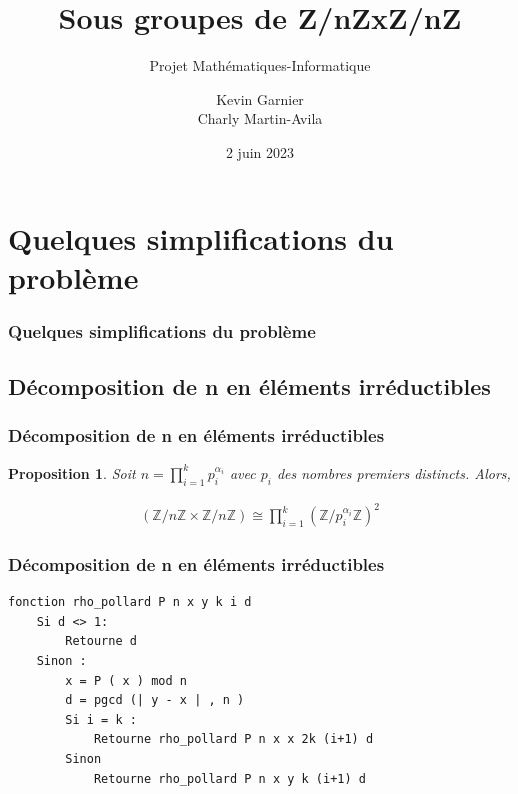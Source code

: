 \documentclass{beamer}
\title{
    Sous groupes de Z/nZxZ/nZ
}
\subtitle{Projet Mathématiques-Informatique}
\institute[U. Paris Cité]{Université Paris Cité}
\author[Kevin G., Charly M.A.]{
    Kevin Garnier \\    Charly Martin-Avila
}
\date{2 juin 2023}
\newtheorem{prp}{Proposition}
\begin{document}
\tableofcontents


\section{Quelques simplifications du problème}
\begin{frame}
\frametitle{Quelques simplifications du problème}
\tableofcontents[currentsection]
\end{frame}


\subsection{Décomposition de n en éléments irréductibles}
\begin{frame}
    \frametitle{Décomposition de n en éléments irréductibles}
    \begin{prp}
        Soit $n = \prod\limits_{i = 1}^k p_i^{\alpha_i}$ avec $p_i$ des nombres premiers distincts. Alors,
    
        \begin{align*}
            (\mathbb{Z}/n\mathbb{Z} \times \mathbb{Z}/n\mathbb{Z})
            \cong
            \prod\limits_{i = 1}^k (\mathbb{Z}/p_i^{\alpha_i}\mathbb{Z})^{2}
        \end{align*}
    \end{prp}
\end{frame}


\begin{frame}[fragile]
    \frametitle{Décomposition de n en éléments irréductibles}
    \begin{verbatim}
fonction rho_pollard P n x y k i d
    Si d <> 1:
        Retourne d
    Sinon :
        x = P ( x ) mod n
        d = pgcd (| y - x | , n )
        Si i = k :
            Retourne rho_pollard P n x x 2k (i+1) d
        Sinon 
            Retourne rho_pollard P n x y k (i+1) d
    \end{verbatim}
\end{frame}
\end{document}
